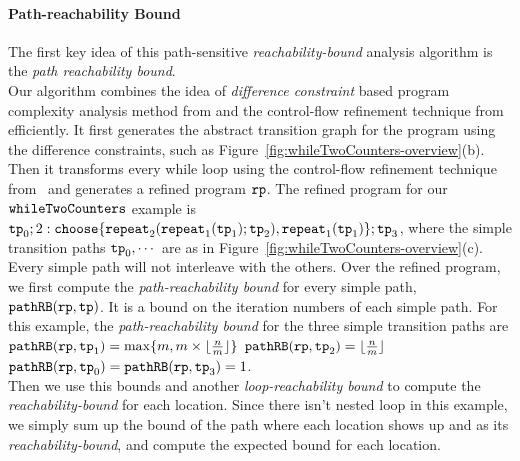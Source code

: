 \paragraph{Path-reachability Bound}
The first key idea of this path-sensitive \emph{reachability-bound} analysis algorithm is the \emph{path reachability bound}.
\\
Our algorithm combines the idea of \emph{difference constraint} based program complexity analysis method from \cite{sinn2017complexity}
and the control-flow refinement technique from~\cite{GulwaniJK09} efficiently.
It first
generates the abstract transition graph for the program using the difference constraints, such as Figure~\ref{fig:whileTwoCounters-overview}(b).
Then it transforms every while loop using the control-flow refinement technique from~\cite{GulwaniJK09} and generates a refined program $\mathtt{rp}$.
% 
The refined program for our $\mathtt{whileTwoCounters}$ example is
$
  \tpath_0 ; 
  2: \rpchoose{\rprepeat_2(\rprepeat_1(\tpath_1); \tpath_2) , 
  \rprepeat_1(\tpath_1) }; \tpath_3
$, where the simple transition paths $\mathtt{tp}_0, \cdots$ are as in Figure~\ref{fig:whileTwoCounters-overview}(c).
Every simple path will not interleave with the others. 
Over the refined program, we first compute the \emph{path-reachability bound} for every simple path,
$\mathtt{pathRB}(\mathtt{rp}, \mathtt{tp})$.
It is a bound on the iteration numbers of each simple path.
For this example, the \emph{path-reachability bound} for the three simple transition paths are
$\mathtt{pathRB}(\mathtt{rp}, \mathtt{tp}_1) = \max\{m, m \times \lfloor\frac{n}{m}\rfloor\}$ \quad
$\mathtt{pathRB}(\mathtt{rp}, \mathtt{tp}_2) = \lfloor\frac{n}{m}\rfloor$ \quad
$\mathtt{pathRB}(\mathtt{rp}, \mathtt{tp}_0) = \mathtt{pathRB}(\mathtt{rp}, \mathtt{tp}_3) = 1$.
\\
Then we use this bounds
and another \emph{loop-reachability bound}
to compute the \emph{reachability-bound} for each location.
Since there isn't nested loop in this example, we simply sum up the bound of the path where each location shows up
and as its \emph{reachability-bound}, and compute the expected bound for each location.
%
